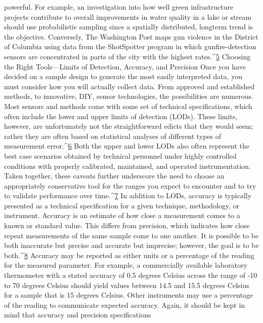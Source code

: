 powerful. For example, an investigation into how well green infrastructure
projects contribute to overall improvements in water quality in a lake or
stream should use probabilistic sampling since a spatially distributed, longterm
trend is the objective. Conversely, The Washington Post maps gun violence
in the District of Columbia using data from the ShotSpotter program
in which gunfire-detection sensors are concentrated in parts of the city with
the highest rates.^{\href{#endnotes-stauffer}{5}}
Choosing the Right Tools—Limits of Detection,
Accuracy, and Precision
Once you have decided on a sample design to generate the most easily interpreted
data, you must consider how you will actually collect data. From
approved and established methods, to innovative, DIY, sensor technologies,
the possibilities are numerous. Most sensors and methods come with some
set of technical specifications, which often include the lower and upper limits of detection (LODs). These limits, however, are unfortunately not the
straightforward edicts that they would seem; rather they are often based on
statistical analyses of different types of measurement error.^{\href{#endnotes-stauffer}{6}} Both the upper
and lower LODs also often represent the best case scenarios obtained by
technical personnel under highly controlled conditions with properly calibrated,
maintained, and operated instrumentation. Taken together, these
caveats further underscore the need to choose an appropriately conservative
tool for the ranges you expect to encounter and to try to validate performance
over time.^{\href{#endnotes-stauffer}{7}}
In addition to LODs, accuracy is typically presented as a technical specification
for a given technique, methodology, or instrument. Accuracy is an
estimate of how close a measurement comes to a known or standard value.
This differs from precision, which indicates how close repeat measurements
of the same sample come to one another. It is possible to be both inaccurate
but precise and accurate but imprecise; however, the goal is to be both.^{\href{#endnotes-stauffer}{8}}
Accuracy may be reported as either units or a percentage of the reading
for the measured parameter. For example, a commercially available laboratory
thermometer with a stated accuracy of 0.5 degrees Celsius across the
range of -10 to 70 degrees Celsius should yield values between 14.5 and 15.5
degrees Celsius for a sample that is 15 degrees Celsius. Other instruments
may use a percentage of the reading to communicate expected accuracy.
Again, it should be kept in mind that accuracy and precision specifications
